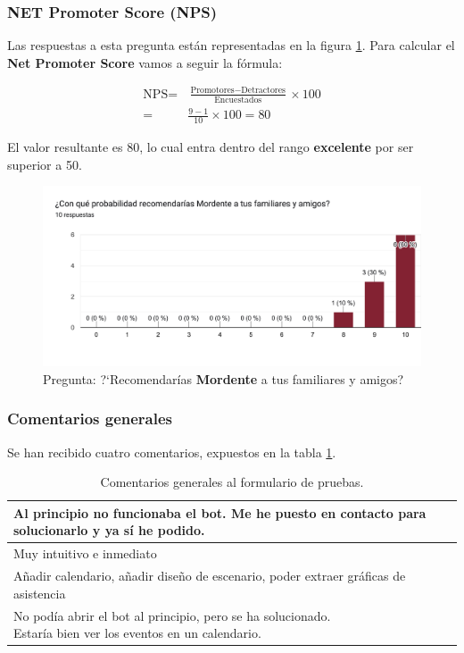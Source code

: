 \subsubsection{NET Promoter Score (NPS)}

Las respuestas a esta pregunta están representadas en la figura \ref{fig:graficoNetScore}.
Para calcular el \textbf{Net Promoter Score} vamos a seguir la fórmula:

\begin{equation*}
\begin{aligned}
\textrm{NPS} ={} & \frac{\textrm{Promotores} - \textrm{Detractores}}{\textrm{Encuestados}} \times 100 \\
={} & \frac{9-1}{10} \times 100 = 80
\end{aligned}
\end{equation*}

El valor resultante es 80, lo cual entra dentro del rango \textbf{excelente} por ser superior a 50.

\begin{figure}[h]
\centering
\includegraphics[width=\textwidth]{imagenes/pruebas/recomendacion.png}
\caption{Pregunta: ?`Recomendarías \textbf{Mordente} a tus familiares y amigos?}
\label{fig:graficoNetScore}
\end{figure}

\subsubsection{Comentarios generales}

Se han recibido cuatro comentarios, expuestos en la tabla \ref{tab:respuestasComentarios}.

\begin{table}[h!]
\centering
\begin{tabularx}{\textwidth}{|X|} 
 \hline
 Al principio no funcionaba el bot. Me he puesto en contacto para solucionarlo y ya sí he podido. \\ 
 \hline
 Muy intuitivo e inmediato \\
 \hline
 Añadir calendario, añadir diseño de escenario, poder extraer gráficas de asistencia \\
 \hline
 \makecell[l]{No podía abrir el bot al principio, pero se ha solucionado. \\ Estaría bien ver los eventos en un calendario.} \\
 \hline
\end{tabularx}
\caption{Comentarios generales al formulario de pruebas.}
\label{tab:respuestasComentarios}
\end{table}

